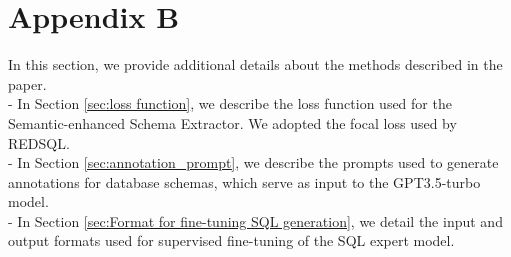 \documentclass[11pt]{article}
\begin{document}
\section{Appendix B}
\label{sec:appendix b}
In this section, we provide additional details about the methods described in the paper. \\
- In Section \ref{sec:loss function}, we describe the loss function used for the Semantic-enhanced Schema Extractor. We adopted the focal loss used by REDSQL.\\
- In Section \ref{sec:annotation_prompt}, we describe the prompts used to generate annotations for database schemas, which serve as input to the GPT3.5-turbo model.\\
- In Section \ref{sec:Format for fine-tuning SQL generation}, we detail the input and output formats used for supervised fine-tuning of the SQL expert model.

\end{document}
